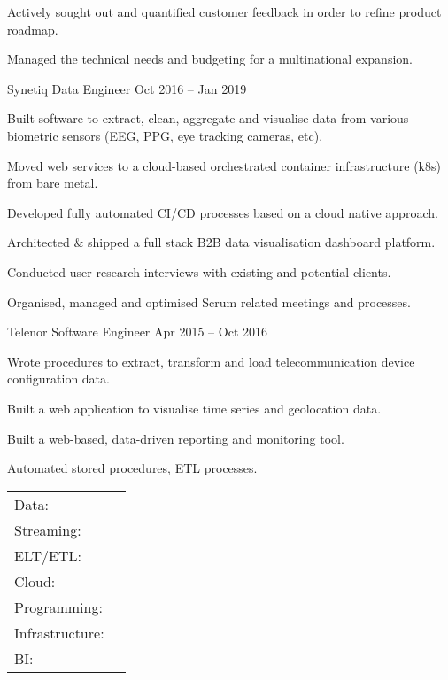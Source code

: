 \documentclass[]{awesome-cv}
\begin{document}
\begin{cventries}
{\begin{cvitems}
		\item {Actively sought out and quantified customer feedback in order to refine product roadmap.}
		\item {Managed the technical needs and budgeting for a multinational expansion.}
		\end{cvitems}}
	\cventry
	{Synetiq}
	{Data Engineer}
	{Oct 2016 – Jan 2019}
	{}
	{\begin{cvitems}
		\item {Built software to extract, clean, aggregate and visualise data from various biometric sensors (EEG, PPG, eye tracking cameras, etc).}
		\item {Moved web services to a cloud-based orchestrated container infrastructure (k8s) from bare metal.}
		\item {Developed fully automated CI/CD processes based on a cloud native approach.}
		\item {Architected \& shipped a full stack B2B data visualisation dashboard platform.}
		\item {Conducted user research interviews with existing and potential clients.}
		\item {Organised, managed and optimised Scrum related meetings and processes.}
		\end{cvitems}}
	\cventry
	{Telenor}
	{Software Engineer}
	{Apr 2015 – Oct 2016}
	{}
	{\begin{cvitems}
		\item {Wrote procedures to extract, transform and load telecommunication device configuration data.}
		\item {Built a web application to visualise time series and geolocation data.}
		\item {Built a web-based, data-driven reporting and monitoring tool.}
		\item {Automated stored procedures, ETL processes.}
		\end{cvitems}}
\end{cventries}
\begin{cventries}
	\cventry
	{}
	{\def\arraystretch{1.15}{\begin{tabular}{ l l }
		Data: & {\skill{ Snowflake, BigQuery, Databricks, Redshift, SQL, DuckDB }} \\
		Streaming: & {\skill{ Kafka, Redpanda, Debezium, CDC, Materialize, Decodable }} \\
		ELT/ETL: & {\skill{ dbt, Airflow, Fivetran, Meltano }} \\ 
		Cloud: & {\skill{ GCP/AWS, Composer, GKE, Cloud Functions, Cloud Build, Pub/Sub, GCS, SNS, SQS, EKS }} \\
		Programming: & {\skill{ Python, Go, shell scripting }} \\
		Infrastructure: & {\skill{ Terraform, Docker, Kubernetes, CI/CD, Google Cloud Platform, GNU/Linux }} \\
		BI: & {\skill{ Looker, Data Studio, Streamlit }} \\
		\end{tabular}}}
	{}
	{}
	{}
\end{cventries}
\end{document}
